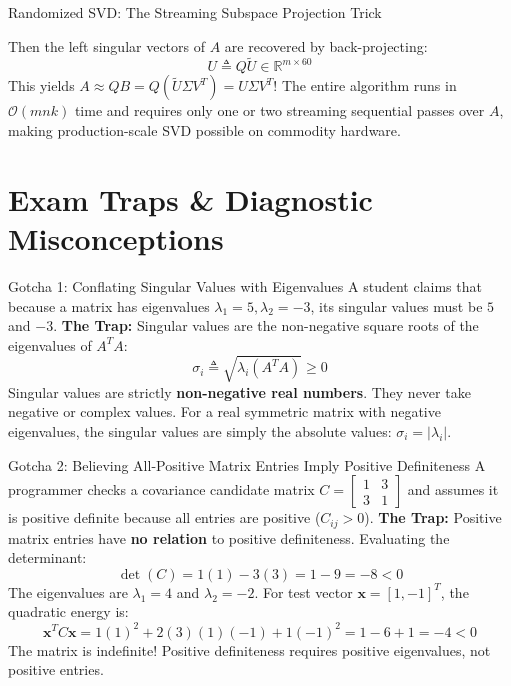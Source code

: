 \begin{ponderbox}{Randomized SVD: The Streaming Subspace Projection Trick}
\begin{enumerate}
\begin{equation*}
    \end{equation*}
    Then the left singular vectors of $A$ are recovered by back-projecting:
    \begin{equation*}
    U \triangleq Q \tilde{U} \in \mathbb{R}^{m \times 60}
    \end{equation*}
    This yields $A \approx Q B = Q (\tilde{U} \Sigma V^T) = U \Sigma V^T$!
    The entire algorithm runs in $\mathcal{O}(m n k)$ time and requires only one or two streaming sequential passes over $A$, making production-scale SVD possible on commodity hardware.
\end{enumerate}
\end{ponderbox}

\section{Exam Traps \& Diagnostic Misconceptions}

\begin{trapbox}{Gotcha 1: Conflating Singular Values with Eigenvalues}
A student claims that because a matrix has eigenvalues $\lambda_1 = 5, \lambda_2 = -3$, its singular values must be $5$ and $-3$.
\textbf{The Trap:} Singular values are the non-negative square roots of the eigenvalues of $A^T A$:
\begin{equation*}
\sigma_i \triangleq \sqrt{\lambda_i(A^T A)} \ge 0
\end{equation*}
Singular values are strictly \textbf{non-negative real numbers}. They never take negative or complex values. For a real symmetric matrix with negative eigenvalues, the singular values are simply the absolute values: $\sigma_i = |\lambda_i|$.
\end{trapbox}

\begin{trapbox}{Gotcha 2: Believing All-Positive Matrix Entries Imply Positive Definiteness}
A programmer checks a covariance candidate matrix $C = \begin{bmatrix} 1 & 3 \\ 3 & 1 \end{bmatrix}$ and assumes it is positive definite because all entries are positive ($C_{ij} > 0$).
\textbf{The Trap:} Positive matrix entries have \textbf{no relation} to positive definiteness. Evaluating the determinant:
\begin{equation*}
\det(C) = 1(1) - 3(3) = 1 - 9 = -8 < 0
\end{equation*}
The eigenvalues are $\lambda_1 = 4$ and $\lambda_2 = -2$. For test vector $\mathbf{x} = [1, -1]^T$, the quadratic energy is:
\begin{equation*}
\mathbf{x}^T C \mathbf{x} = 1(1)^2 + 2(3)(1)(-1) + 1(-1)^2 = 1 - 6 + 1 = -4 < 0
\end{equation*}
The matrix is indefinite! Positive definiteness requires positive eigenvalues, not positive entries.
\end{trapbox}


